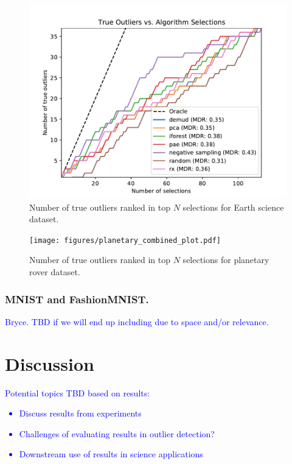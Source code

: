 \documentclass[letterpaper]{article} %
\newcommand{\todo}[1]{\textcolor{blue}{#1}}
\begin{document}
\begin{figure}
    \centering
    \includegraphics[width=\linewidth]{figures/faw_combined_plot.pdf}
    \caption{Number of true outliers ranked in top $N$ selections for 
    Earth science dataset.}
    \label{fig:faw_results}
\end{figure}


\begin{figure}
    \centering
    \texttt{[image: figures/planetary\_combined\_plot.pdf]}
    \caption{Number of true outliers ranked in top $N$ selections for 
    planetary rover dataset.}
    \label{fig:planetary_results}
\end{figure}


\subsubsection{MNIST and FashionMNIST.}
\todo{Bryce. TBD if we will end up including due to
space and/or relevance.}


\section{Discussion}
\todo{ 
Potential topics TBD based on results:
\begin{itemize}
\item Discuss results from experiments
\item Challenges of evaluating results in outlier detection?
\item Downstream use of results in science applications
\end{itemize}
}
\end{document}

